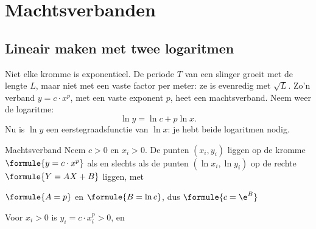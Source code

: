
\begin{oefeningen}
\end{oefeningen}

\section{Machtsverbanden}

\subsection{Lineair maken met twee logaritmen}

Niet elke kromme is exponentieel. De periode $T$ van een slinger groeit met de lengte $L$, maar niet met een vaste factor per meter: ze is evenredig met $\sqrt L$. Zo'n verband $y = c \cdot x^p$, met een vaste exponent $p$, heet een machtsverband. Neem weer de logaritme:
\[ \ln y = \ln c + p\ln x . \]
Nu is $\ln y$ een eerstegraadsfunctie van $\ln x$: je hebt beide logaritmen nodig.

\begin{theorie}
\begin{stelling}{Machtsverband}
Neem $c > 0$ en $x_i > 0$. De punten $(x_i, y_i)$ liggen op de kromme $\formule{y = c \cdot x^p}$ als en slechts als de punten $(\ln x_i, \ln y_i)$ op de rechte $\formule{Y = AX + B}$ liggen, met

\vspace{1mm}
\qquad $\formule{A = p}$ \quad en \quad $\formule{B = \ln c}$, \quad dus \quad $\formule{c = \e^B}$
\end{stelling}

\begin{bewijs}
Voor $x_i > 0$ is $y_i = c \cdot x_i^p > 0$, en
\end{bewijs}
\end{theorie}

